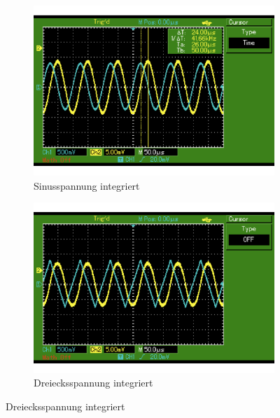 \begin{figure}[h!]
 \centering
 \begin{subfigure}{0.48\textwidth}
  \centering
  \includegraphics[width=\textwidth]{Oszilloskop1.pdf}
  \caption{Sinusspannung integriert}
  \label{fig:intsin}
 \end{subfigure}
 \begin{subfigure}{0.48\textwidth}
  \centering
  \includegraphics[width=\textwidth]{Oszilloskop2.pdf}
  \caption{Dreiecksspannung integriert}
  \label{fig:90gradnormal}
 \end{subfigure}
\end{figure}

